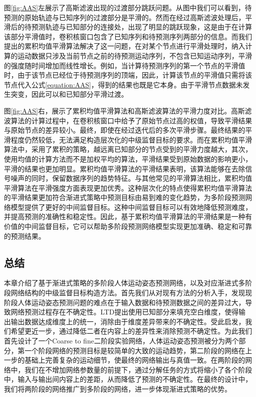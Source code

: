 图\ref{fig:AAS}左展示了高斯滤波出现的过渡部分跳跃问题。从图中我们可以看到，待预测的原始轨迹与已知序列的过渡部分是平滑的。然而在经过高斯滤波处理后，平滑后的待预测轨迹与已知部分的连接处，出现了明显的跳跃现象，这是由于在计算该部分平滑值时，卷积核窗口包含了已知序列和待预测序列两部分的信息。而我们提出的累积均值平滑算法解决了这一问题，在对某个节点进行平滑处理时，纳入计算的运动数据只涉及当前节点之前的待预测运动序列，不包含已知运动序列，平滑的强度随时间增加而线性增长。例如，当计算待预测序列的第一个节点的平滑值时，由于该节点已经位于待预测序列的顶端，因此，计算该节点的平滑值只需将该节点代入公式\ref{equation:AAS}，得到的结果也既是它本身。由于平滑节点数据未发生突变，因此可以和已知部分平滑过渡。

图\ref{fig:AAS}右，展示了累积均值平滑算法和高斯滤波算法的平滑力度对比。高斯滤波算法的计算过程中，在卷积核窗口中给予了原始节点过高的权值，导致平滑结果与原始节点的差异较小。最终，即使在经过迭代后的多次平滑步骤。最终结果的平滑程度仍然较低，无法满足构造层次化的中级监督目标的要求。而在累积均值平滑算法中，采用了累积的策略，越远离已知部分的节点受到的平滑力度越大，其次，使用均值的计算方法而不是加权平均的算法，平滑结果受到原始数据的影响更小，平滑的结果也更加明显。累积均值平滑算法的平滑结果表明，该算法能够在去除信号噪声的同时，保留数据序列的趋势特征。与其他常见的平滑算法相比，累积均值平滑算法在平滑强度方面表现更加优秀。这种层次化的特点使得累积均值平滑算法的平滑结果更加符合渐进式策略中预测目标由易到难的变化趋势，为多阶段预测网络模型提供了更好的中间监督目标。这种中间监督目标可以有效地降低预测难度，并提高预测的准确性和稳定性。因此，基于累积均值平滑算法的平滑结果是一种有价值的中间监督目标，它可以帮助多阶段预测网络模型实现更加准确、稳定和可靠的预测结果。

\subsection{总结}
本章介绍了基于渐进式策略的多阶段人体运动姿态预测网络，以及对应渐进式多阶段网络结构的中级监督目标构造方法。首先我们从对现有方法的分析入手，发现现阶段人体运动姿态预测问题的难点在于输入数据和待预测数据之间的差异过大，导致网络预测过程存在不确定性。LTD提出使用已知部分来填充空白维度，使得输出输出数据达成维度上的统一，消除由于维度差异带来的不确定性。受此启发，我们希望更近一步，通过降低二者在内容上的差异性来消除预测不确定性。为此我们首先设计了一个Coarse to fine二阶段实验网络，人体运动姿态预测被分为两个部分，第一个阶段网络的预测目标是较简单的大致的运动趋势，第二阶段的网络在上一步的基础上完善复杂的运动细节，使最终的网络输出与真值一致。在两阶段的网络中，我们在不增加网络参数量的前提下，通过分解任务的方式将缩小了各个阶段中，输入与输出间内容上的差距，从而降低了预测的不确定性。在最终的设计中，我们将两阶段的网络推广到多阶段的网络，进一步体现渐进式策略的优势。


